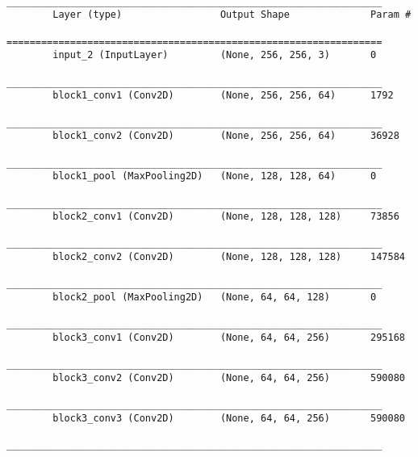 \begin{table}[H]
    \centering
    \begin{lstlisting}
        _________________________________________________________________
        Layer (type)                 Output Shape              Param #   
        =================================================================
        input_2 (InputLayer)         (None, 256, 256, 3)       0         
        _________________________________________________________________
        block1_conv1 (Conv2D)        (None, 256, 256, 64)      1792      
        _________________________________________________________________
        block1_conv2 (Conv2D)        (None, 256, 256, 64)      36928     
        _________________________________________________________________
        block1_pool (MaxPooling2D)   (None, 128, 128, 64)      0         
        _________________________________________________________________
        block2_conv1 (Conv2D)        (None, 128, 128, 128)     73856     
        _________________________________________________________________
        block2_conv2 (Conv2D)        (None, 128, 128, 128)     147584    
        _________________________________________________________________
        block2_pool (MaxPooling2D)   (None, 64, 64, 128)       0         
        _________________________________________________________________
        block3_conv1 (Conv2D)        (None, 64, 64, 256)       295168    
        _________________________________________________________________
        block3_conv2 (Conv2D)        (None, 64, 64, 256)       590080    
        _________________________________________________________________
        block3_conv3 (Conv2D)        (None, 64, 64, 256)       590080    
        _________________________________________________________________

\end{lstlisting}
\end{table}
